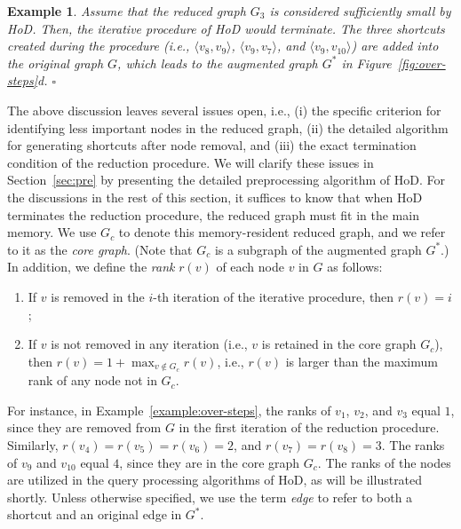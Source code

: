 \documentclass{sig-alternate}
\newtheorem{example} {Example}
\def\done{\hspace*{\fill} {$\square$}}
\def\vgap{\vspace{0mm}}
\def\G{G^*}
\def\GC{G_c}
\begin{document}
\begin{sloppy}
\begin{example}
Assume that the reduced graph $G_3$ is considered sufficiently small by HoD. Then, the iterative procedure of HoD would terminate. The three shortcuts created during the procedure (i.e., $\langle v_8, v_9\rangle$, $\langle v_9, v_7 \rangle$, and $\langle v_9, v_{10}\rangle$) are added into the original graph $G$, which leads to the augmented graph $\G$ in Figure~\ref{fig:over-steps}d. \done
\end{example}

\vgap

The above discussion leaves several issues open, i.e., (i) the specific criterion for identifying less important nodes in the reduced graph, (ii) the detailed algorithm for generating shortcuts after node removal, and (iii) the exact termination condition of the reduction procedure. We will clarify these issues in Section~\ref{sec:pre} by presenting the detailed preprocessing algorithm of HoD. For the discussions in the rest of this section, it suffices to know that when HoD terminates the reduction procedure, the reduced graph must fit in the main memory. We use $\GC$ to denote this memory-resident reduced graph, and we refer to it as the {\em core graph}. (Note that $\GC$ is a subgraph of the augmented graph $\G$.) In addition, we define the {\em rank} $r(v)$ of each node $v$ in $G$ as follows:
\begin{enumerate} [itemsep = 0.5mm, topsep = 2mm] %
\item If $v$ is removed in the $i$-th iteration of the iterative procedure, then $r(v) = i$;

\item If $v$ is not removed in any iteration (i.e., $v$ is retained in the core graph $\GC$), then $r(v) = 1 + \max_{v \notin \GC} r(v)$, i.e., $r(v)$ is larger than the maximum rank of any node not in $\GC$.
\end{enumerate}
For instance, in Example~\ref{example:over-steps},
the ranks of $v_1$, $v_2$, and $v_3$ equal $1$, since they are removed from $G$ in the first iteration of the reduction procedure. Similarly, $r(v_4) = r(v_5) = r(v_6) = 2$, and $r(v_7) = r(v_8) = 3$. The ranks of $v_9$ and $v_{10}$ equal $4$, since they are in the core graph $\GC$. The ranks of the nodes are utilized in the query processing algorithms of HoD, as will be illustrated shortly. Unless otherwise specified, we use the term {\em edge} to refer to both a shortcut and an original edge in $\G$.


\end{sloppy}
\end{document}
